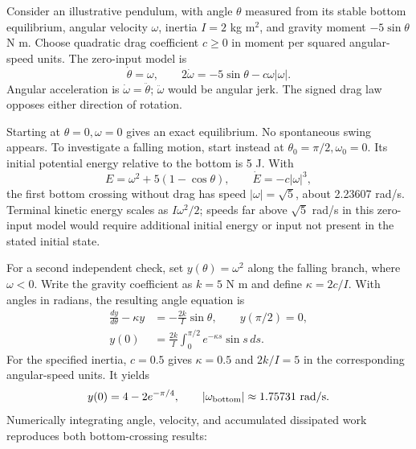 Consider an illustrative pendulum, with angle $\theta$ measured from its stable
bottom equilibrium, angular velocity $\omega$, inertia $I=2$ kg m$^2$, and
gravity moment $-5\sin\theta$ N m. Choose quadratic drag coefficient
$c\geq0$ in moment per squared angular-speed units. The zero-input model is
\begin{equation}
 \dot\theta=\omega,\qquad
 2\dot\omega=-5\sin\theta-c\omega|\omega|.
 \label{eq:ZTCF-with-drag}
\end{equation}
Angular acceleration is $\dot\omega=\ddot\theta$; $\ddot\omega$ would be
angular jerk. The signed drag law opposes either direction of rotation.

Starting at $\theta=0,\omega=0$ gives an exact equilibrium. No spontaneous
swing appears. To investigate a falling motion, start instead at
$\theta_0=\pi/2,\omega_0=0$. Its initial potential energy relative to the
bottom is 5 J. With
\begin{equation}
 E=\omega^2+5(1-\cos\theta),\qquad
 \dot E=-c|\omega|^3,
 \label{eq:drag_pendulum_energy}
\end{equation}
the first bottom crossing without drag has speed $|\omega|=\sqrt5$, about
2.23607 rad/s. Terminal kinetic energy scales as $I\omega^2/2$; speeds far
above $\sqrt{5}$ rad/s in this zero-input model would require additional initial
energy or input not present in the stated initial state.

For a second independent check, set $y(\theta)=\omega^2$ along the falling
branch, where $\omega<0$. Write the gravity coefficient as $k=5$ N m and
define $\kappa=2c/I$. With angles in radians, the resulting angle equation is
\begin{equation}
 \begin{aligned}
 \frac{dy}{d\theta}-\kappa y&=-\frac{2k}{I}\sin\theta,
 \qquad y(\pi/2)=0,\\
 y(0)&=\frac{2k}{I}\int_0^{\pi/2}e^{-\kappa s}\sin s\,ds.
 \end{aligned}
 \label{eq:drag_angle_solution}
\end{equation}
For the specified inertia, $c=0.5$ gives $\kappa=0.5$ and $2k/I=5$ in the
corresponding angular-speed units. It yields
\begin{equation}
 y(0)=4-2e^{-\pi/4},\qquad
 |\omega_{\rm bottom}|\approx1.75731\ {\rm rad/s}.
 \label{eq:drag_bottom_speed}
\end{equation}
Numerically integrating angle, velocity, and accumulated dissipated work
reproduces both bottom-crossing results:

